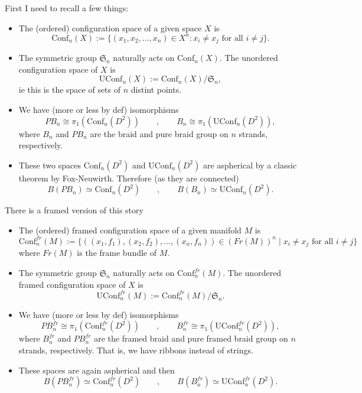 \documentclass[11pt]{article}
\theoremstyle{definition}
\begin{document}
First I need to recall a few things:
\begin{itemize}
    \item The (ordered) configuration space of a given space $X$ is $$\text{Conf}_n(X) := \{ (x_1, x_2, \ldots, x_n) \in X^n : x_i \neq x_j \text{ for all } i \neq j \}.$$
    \item The symmetric group $\mathfrak{S}_n$ naturally acts on $\text{Conf}_n(X)$. The unordered configuration space of $X $ is 
    $$ \text{UConf}_n(X) := \text{Conf}_n(X)/\mathfrak{S}_n ,$$ ie this is the space of sets of $n$ distint points.
    \item We have (more or less by def) isomorphisms
    $$ PB_n \cong \pi_1 (\text{Conf}_n(D^2))  \qquad , \qquad   B_n \cong \pi_1 (\text{UConf}_n(D^2)) ,$$
    where $B_n$ and $PB_n$ are the braid and pure braid group on $n$ strands, respectively.
    \item  These two spaces $\text{Conf}_n(D^2)$ and $\text{UConf}_n(D^2)$ are aspherical by a classic theorem by Fox-Neuwirth. Therefore (as they are connected) $$  B( PB_n) \simeq \text{Conf}_n(D^2)  \qquad , \qquad   B(B_n) \simeq \text{UConf}_n(D^2).  $$

\end{itemize}

There is a framed version of this story

\begin{itemize}
    \item The (ordered) framed configuration space of a given manifold $M$ is $$ \text{Conf}_n^{fr}(M):=  \{ ((x_1, f_1), (x_2, f_2), \ldots, (x_n, f_n)) \in (Fr(M))^n \mid x_i \neq x_j \text{ for all } i \neq j \}$$
    where $Fr(M)$ is the frame bundle of $M$.
    \item The symmetric group $\mathfrak{S}_n$ naturally acts on $\text{Conf}_n^{fr}(M)$. The unordered framed configuration space of $X $ is 
    $$ \text{UConf}_n^{fr}(M) := \text{Conf}_n^{fr}(M)/\mathfrak{S}_n .$$
    \item  We have (more or less by def) isomorphisms
    $$ PB_n^{fr} \cong \pi_1 (\text{Conf}_n^{fr}(D^2))  \qquad , \qquad   B_n^{fr} \cong \pi_1 (\text{UConf}^{fr}_n(D^2)) ,$$
    where $B_n^{fr}$ and $PB_n^{fr}$ are the framed braid and pure framed braid group on $n$ strands, respectively. That is, we have ribbons instead of strings.
    \item These spaces are again aspherical and then 
    $$  B( PB_n^{fr}) \simeq \text{Conf}^{fr}_n(D^2)  \qquad , \qquad   B(B_n^{fr}) \simeq \text{UConf}^{fr}_n(D^2).  $$
\end{itemize}
\end{document}
